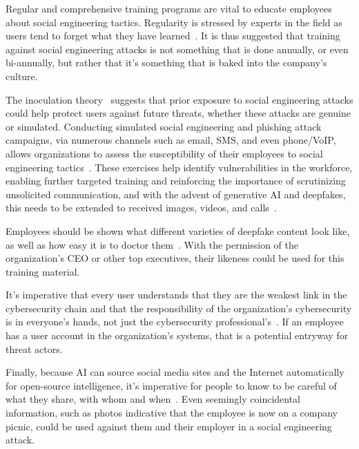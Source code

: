 Regular and comprehensive training programs are vital to educate employees about social engineering tactics. Regularity is stressed by experts in the field as users tend to forget what they have learned~\citep{hadnagy_Social_Engineering_The_Science_2018, mitnick_The_Art_of_Deception_2003}. It is thus suggested that training against social engineering attacks is not something that is done annually, or even bi-annually, but rather that it's something that is baked into the company's culture. 

The inoculation theory~\citep{blauth_AI_Crime_Overview_Malicious_Use_Abuse_2022} suggests that prior exposure to social engineering attacks could help protect users against future threats, whether these attacks are genuine or simulated. Conducting simulated social engineering and phishing attack campaigns, via numerous channels such as email, SMS, and even phone/VoIP, allows organizations to assess the susceptibility of their employees to social engineering tactics~\citep{hadnagy_Social_Engineering_The_Science_2018}. These exercises help identify vulnerabilities in the workforce, enabling further targeted training and reinforcing the importance of scrutinizing unsolicited communication, and with the advent of generative AI and deepfakes, this needs to be extended to received images, videos, and calls~\citep{mirsky_Creation_Detection_Deepfakes_2021}.

Employees should be shown what different varieties of deepfake content look like, as well as how easy it is to doctor them~\citep{mirsky_Creation_Detection_Deepfakes_2021}. With the permission of the organization’s CEO or other top executives, their likeness could be used for this training material.

It's imperative that every user understands that they are the weakest link in the cybersecurity chain and that the responsibility of the organization's cybersecurity is in everyone's hands, not just the cybersecurity professional's~\citep{mitnick_The_Art_of_Deception_2003}. If an employee has a user account in the organization’s systems, that is a potential entryway for threat actors.

Finally, because AI can source social media sites and the Internet automatically for open-source intelligence, it's imperative for people to know to be careful of what they share, with whom and when~\citep{mitnick_The_Art_of_Deception_2003}. Even seemingly coincidental information, such as photos indicative that the employee is now on a company picnic, could be used against them and their employer in a social engineering attack.

